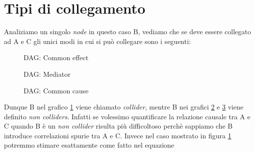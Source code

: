 \section{Tipi di collegamento}
Analiziamo un singolo \textit{node} in questo caso B, vediamo che se deve essere collegato ad A e C gli unici modi in cui si può collegare sono i seguenti: 
\begin{figure}[H]
\centering    
\caption{DAG: Common effect}
\label{DAG:Common effect}
\end{figure} 
\begin{figure}[H]
	\centering
\caption{DAG: Mediator}
\label{DAG:Mediator}
\end{figure} 
\begin{figure}[H]
	\centering
\caption{DAG: Common cause}
\label{DAG:Common cause}
\end{figure}

Dunque B nel grafico \ref{DAG:Common effect} viene chiamato \textit{collider}, mentre B nei grafici \ref{DAG:Mediator} e \ref{DAG:Common cause} viene definito \textit{non colliders}.
Infatti se volessimo quantificare la relazione causale tra A e C quando B è un \textit{non collider} risulta più difficoltoso perchè sappiamo che B introduce correlazioni spurie tra A e C. Invece nel caso mostrato in figura \ref{DAG:Common effect} potremmo stimare esattamente come fatto nel equazione 


